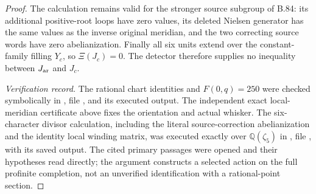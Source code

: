 \begin{proof}
The calculation remains valid for the stronger source subgroup of B.84:
its additional positive-root loops have zero values, its deleted Nielsen
generator has the same values as the inverse original meridian, and the
two correcting source words have zero abelianization. Finally all six
units extend over the constant-family filling $Y_c$, so $\Xi(J_c)=0$.
The detector therefore supplies no inequality between $J_{\rm ar}$
and $J_c$.

\emph{Verification record.}
The rational chart identities and $F(0,q)=250$ were checked symbolically
in , file
, and its executed output. The independent exact local-meridian certificate above
fixes the orientation and actual whisker. The six-character divisor
calculation, including the literal source-correction abelianization and
the identity local winding matrix, was executed exactly over
$\mathbb Q(\zeta_5)$ in , file
, with its saved output.
The cited primary passages were
opened and their hypotheses read directly; the argument constructs a
selected action on the full profinite completion, not an unverified
identification with a rational-point section.
\end{proof}
